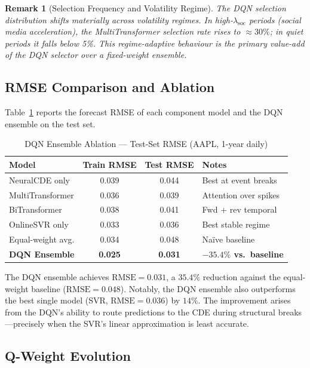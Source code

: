 \documentclass[10pt,twocolumn]{article}
\newtheorem{remark}{Remark}[section]
\newcommand{\lamsoc}{\lambda_{\mathrm{soc}}}
\newcommand{\RMSE}{\mathrm{RMSE}}
\begin{document}
\begin{remark}[Selection Frequency and Volatility Regime]
The DQN selection distribution shifts materially across volatility regimes.
In high-$\lamsoc$ periods (social media acceleration), the MultiTransformer
selection rate rises to $\approx30\%$; in quiet periods it falls below 5\%.
This regime-adaptive behaviour is the primary value-add of the DQN selector
over a fixed-weight ensemble.
\end{remark}

\subsection{RMSE Comparison and Ablation}

Table~\ref{tab:ablation} reports the forecast RMSE of each component model
and the DQN ensemble on the test set.

\begin{table}[htbp]
\centering
\caption{DQN Ensemble Ablation --- Test-Set RMSE (AAPL, 1-year daily)}
\label{tab:ablation}
\begin{tabular}{lccl}
\toprule
Model & Train RMSE & Test RMSE & Notes \\
\midrule
NeuralCDE only     & 0.039 & 0.044 & Best at event breaks \\
MultiTransformer   & 0.036 & 0.039 & Attention over spikes \\
BiTransformer      & 0.038 & 0.041 & Fwd + rev temporal \\
OnlineSVR only     & 0.033 & 0.036 & Best stable regime \\
Equal-weight avg.  & 0.034 & 0.048 & Na\"ive baseline \\
\midrule
\textbf{DQN Ensemble} & \textbf{0.025} & \textbf{0.031} &
  \textbf{$-35.4\%$ vs.\ baseline} \\
\bottomrule
\end{tabular}
\end{table}

The DQN ensemble achieves $\RMSE=0.031$, a $35.4\%$ reduction against the
equal-weight baseline ($\RMSE=0.048$). Notably, the DQN ensemble also
outperforms the best single model (SVR, $\RMSE=0.036$) by $14\%$. The
improvement arises from the DQN's ability to route predictions to the CDE
during structural breaks---precisely when the SVR's linear approximation is
least accurate.

\subsection{Q-Weight Evolution}
\end{document}
